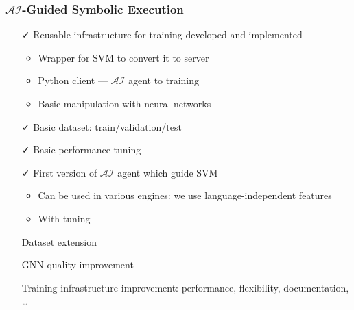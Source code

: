 \documentclass[xcolor=table,aspectratio=169]{beamer}
\begin{document}
\begin{frame}[fragile]
  \frametitle{$\mathcal{AI}$-Guided Symbolic Execution}  
  \begin{itemize}
    \item[\faCheck] Reusable infrastructure for training developed and implemented
      \begin{itemize}
        \item Wrapper for SVM to convert it to server
        \item Python client --- $\mathcal{AI}$ agent to training
        \item Basic manipulation with neural networks 
      \end{itemize}
    \item[\faCheck] Basic dataset: train/validation/test
    \item[\faCheck] Basic performance tuning
    \item[\faCheck] First version of $\mathcal{AI}$ agent which guide SVM
    \begin{itemize}
      \item Can be used in various engines: we use language-independent features 
      \item With tuning
    \end{itemize}
    \item[\faGears] Dataset extension
    \item[\faGears] GNN quality improvement 
    \item[\faGears] Training infrastructure improvement: performance, flexibility, documentation, \ldots 
  \end{itemize}
\end{frame}
\end{document}
